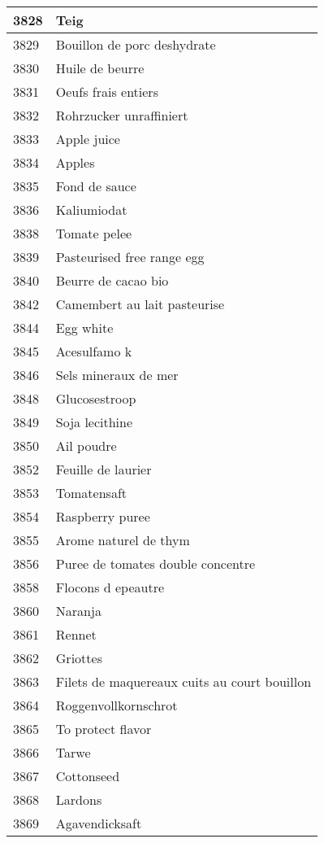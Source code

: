 \begin{longtable}{|l|l|}
3828 & Teig \\ \hline 
3829 & Bouillon de porc deshydrate \\ \hline 
3830 & Huile de beurre \\ \hline 
3831 & Oeufs frais entiers \\ \hline 
3832 & Rohrzucker unraffiniert \\ \hline 
3833 & Apple juice \\ \hline 
3834 & Apples \\ \hline 
3835 & Fond de sauce \\ \hline 
3836 & Kaliumiodat \\ \hline 
3838 & Tomate pelee \\ \hline 
3839 & Pasteurised free range egg \\ \hline 
3840 & Beurre de cacao bio \\ \hline 
3842 & Camembert au lait pasteurise \\ \hline 
3844 & Egg white \\ \hline 
3845 & Acesulfamo k \\ \hline 
3846 & Sels mineraux de mer \\ \hline 
3848 & Glucosestroop \\ \hline 
3849 & Soja lecithine \\ \hline 
3850 & Ail poudre \\ \hline 
3852 & Feuille de laurier \\ \hline 
3853 & Tomatensaft \\ \hline 
3854 & Raspberry puree \\ \hline 
3855 & Arome naturel de thym \\ \hline 
3856 & Puree de tomates double concentre \\ \hline 
3858 & Flocons d epeautre \\ \hline 
3860 & Naranja \\ \hline 
3861 & Rennet \\ \hline 
3862 & Griottes \\ \hline 
3863 & Filets de maquereaux cuits au court bouillon \\ \hline 
3864 & Roggenvollkornschrot \\ \hline 
3865 & To protect flavor \\ \hline 
3866 & Tarwe \\ \hline 
3867 & Cottonseed \\ \hline 
3868 & Lardons \\ \hline 
3869 & Agavendicksaft \\ \hline 

\end{longtable}
